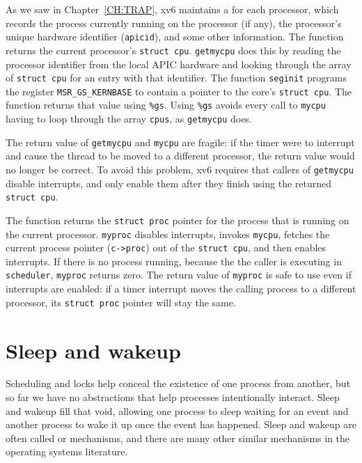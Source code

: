As we saw in Chapter~\ref{CH:TRAP},
xv6 maintains a
for each processor, which records
the process currently running
on the processor (if any),
the processor's unique hardware identifier
(\lstinline{apicid}),
and some other information.
The function
returns the current processor's
\lstinline{struct cpu}.
\lstinline{getmycpu}
does this by reading the processor
identifier from the local APIC hardware and looking through
the array of
\lstinline{struct cpu}
for an entry with that identifier.
The function 
\lstinline{seginit}
programs the register
\lstinline{MSR_GS_KERNBASE}
to contain a pointer to the core's
\lstinline{struct cpu}.
The function
returns that
value using
\texttt{\%gs}.
Using
\texttt{\%gs}
avoids every call to
\lstinline{mycpu}
having to loop
through the array
\lstinline{cpus},
as
\lstinline{getmycpu}
does.

The return value of
\lstinline{getmycpu}
and
\lstinline{mycpu}
are fragile: if the timer were to interrupt and cause
the thread to be moved to a different processor, the
return value would no longer be correct.
To avoid this problem, xv6 requires that callers of
\lstinline{getmycpu}
disable interrupts, and only enable
them after they finish using the returned
\lstinline{struct cpu}.

The function
returns the
\lstinline{struct proc}
pointer
for the process that is running on the current processor.
\lstinline{myproc}
disables interrupts, invokes
\lstinline{mycpu},
fetches the current process pointer
(\lstinline{c->proc})
out of the
\lstinline{struct cpu},
and then enables interrupts.
If there is no process running, because the the caller is
executing in
\lstinline{scheduler},
\lstinline{myproc}
returns zero.
The return value of
\lstinline{myproc}
is safe to use even if interrupts are enabled:
if a timer interrupt moves the calling process to a
different processor, its
\lstinline{struct proc}
pointer will stay the same.
\section{Sleep and wakeup}

Scheduling and locks help conceal the existence of one process
from another,
but so far we have no abstractions that help
processes intentionally interact.
Sleep and wakeup fill that void, allowing one process to 
sleep waiting for an event and another process to wake it up
once the event has happened.
Sleep and wakeup are often called 
or 
mechanisms, and there are many other similar mechanisms
in the operating systems literature.

